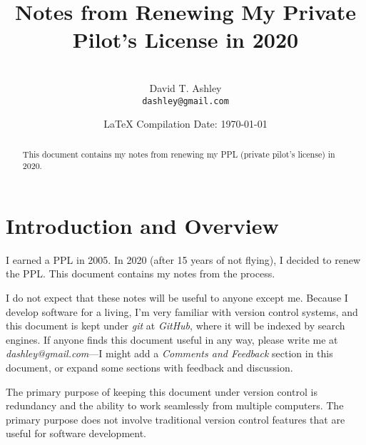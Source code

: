 \documentclass[letterpaper,10pt,titlepage]{article}
\begin{document}
\title{Notes from Renewing My Private Pilot's License in 2020}
\author{\vspace{4cm}\\David T. Ashley\\\texttt{dashley@gmail.com}\\\vspace{4cm}}
\date{\small{\LaTeX{} Compilation Date: \today{}}}
\maketitle

%
\begin{abstract}
This document contains my notes from renewing my PPL (private pilot's license)
in 2020.
\end{abstract}

\clearpage{}
\tableofcontents{}
\clearpage{}
\listoffigures
\clearpage{}

%
\setcounter{page}{1}

\section{Introduction and Overview}
\label{siov0}

I earned a PPL in 2005.  In 2020 (after 15 years of not flying), I decided
to renew the PPL.  This document contains my notes from the process.

I do not expect that these notes will be useful to anyone except me.  Because I
develop software for a living, I'm very familiar with version control systems,
and this document is kept under \emph{git} at \emph{GitHub}, where it will
be indexed by search
engines.  If anyone finds this document useful in any way, please write me
at \emph{dashley@gmail.com}---I might add a \emph{Comments and Feedback}
section in this document, or expand some sections with feedback and discussion.

The primary purpose of keeping this document under version control is
redundancy and the ability to work seamlessly from multiple computers.  The
primary purpose does not involve traditional version control features that are
useful for software development.
\end{document}
